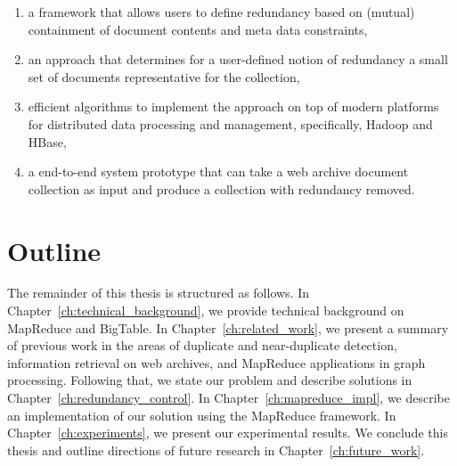 \begin{enumerate}

  \item a framework that allows users to define redundancy based on (mutual)
    containment of document contents and meta data constraints,
  \item an approach that determines for a user-defined notion of redundancy a
    small set of documents representative for the collection,
  \item efficient algorithms to implement the approach on top of modern
    platforms for distributed data processing and management, specifically,
    Hadoop and HBase,
  \item a end-to-end system prototype that can take a web archive document
    collection as input and produce a collection with redundancy removed.

    \begin{comment}
\item use existing measures and methods to define if a document is ``redundant"
  or ``covered."
\item propose an efficient method to find the set of all redundant documents
  and the set of all representative documents in a collection.
\item use existing frameworks to run the method proposed above in a distributed
  computing environment.
\item propose an end-to-end system prototype that can take a web archive
  document collection and produce a collection with redundancies removed.

  \end{comment}
\end{enumerate}

\section{Outline}

The remainder of this thesis is structured as follows. In
Chapter~\ref{ch:technical_background}, we provide technical background on
MapReduce and BigTable. In Chapter~\ref{ch:related_work}, we present a
summary of previous work in the areas of duplicate and near-duplicate detection,
information retrieval on web archives, and MapReduce applications in graph
processing. Following that, we state our problem and describe solutions in
Chapter~\ref{ch:redundancy_control}. In Chapter~\ref{ch:mapreduce_impl}, we
describe an implementation of our solution using the MapReduce framework. In
Chapter~\ref{ch:experiments}, we present our experimental results. We conclude
this thesis and outline directions of future research in Chapter~\ref{ch:future_work}.

